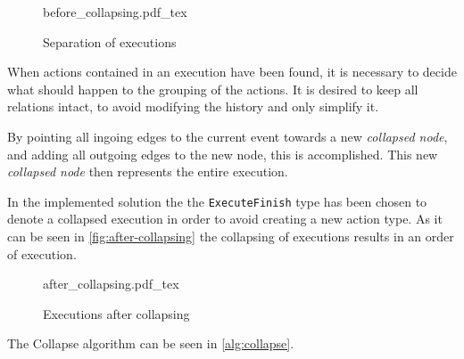 	\begin{figure}
		\centering
		\def\svgwidth{0.42\columnwidth}
		\fontsize{6}{8}\selectfont
		{before_collapsing.pdf_tex}
		\caption{Separation of executions}
		\label{fig:before-collapsing}
	\end{figure}
	
	\newpar When actions contained in an execution have been found, it is necessary to decide what should happen to the grouping of the actions. It is desired to keep all relations intact, to avoid modifying the history and only simplify it. 
	
	By pointing all ingoing edges to the current event towards a new \textit{collapsed node}, and adding all outgoing edges to the new node, this is accomplished. This new \textit{collapsed node} then represents the entire execution. 
	
	In the implemented solution the the \texttt{ExecuteFinish} type has been chosen to denote a collapsed execution in order to avoid creating a new action type. As it can be seen in \autoref{fig:after-collapsing} the collapsing of executions results in an order of execution.
	
	\begin{figure}
		\centering
		\def\svgwidth{0.22\columnwidth}
		\fontsize{6}{8}\selectfont
		{after_collapsing.pdf_tex}
		\caption{Executions after collapsing}
		\label{fig:after-collapsing}
	\end{figure}
	
	The Collapse algorithm can be seen in \autoref{alg:collapse}.
	
